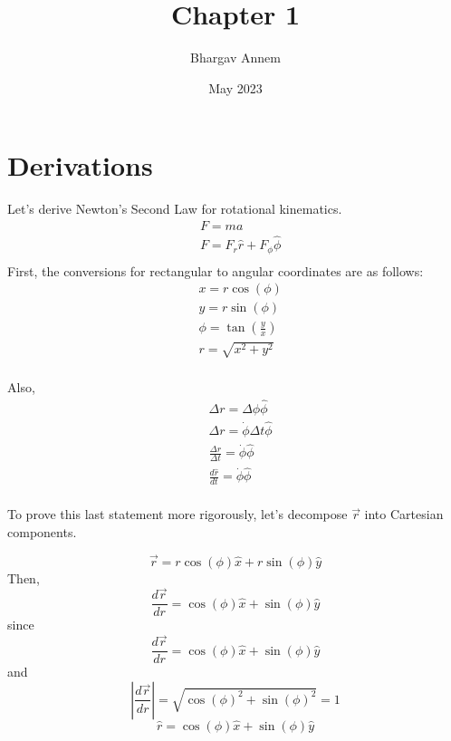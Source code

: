 \documentclass{article}
\title{Chapter 1}
\author{Bhargav Annem}
\date{May 2023}
\begin{document}
\maketitle

\section{Derivations}
Let's derive Newton's Second Law for rotational kinematics.
\begin{equation}
    \begin{aligned}
         & F = ma                              \\
         & F = F_r \hat{r} + F_\phi \hat{\phi} \\
    \end{aligned}
\end{equation}
First, the conversions for rectangular to angular coordinates are as follows:
\begin{equation}
    \begin{aligned}
         & x = r\cos(\phi)          \\
         & y = r\sin(\phi)          \\
         & \phi = \tan(\frac{y}{x}) \\
         & r = \sqrt{x^2+y^2}       \\
    \end{aligned}
\end{equation}

Also,
\begin{equation}
    \begin{aligned}
         & \Delta r=\Delta \phi \hat{\phi}                   \\
         & \Delta r = \dot{\phi} \Delta t \hat{\phi}         \\
         & \frac{\Delta r}{\Delta t} = \dot{\phi} \hat{\phi} \\
         & \frac{d\hat{r}}{dt} = \dot{\phi} \hat{\phi}       \\
    \end{aligned}
\end{equation}

To prove this last statement more rigorously, let's decompose $\vec{r}$ into Cartesian components.

\[\vec{r} = r\cos(\phi)\hat{x} + r\sin(\phi)\hat{y}\]
Then,
\[\frac{d\vec{r}}{dr} = \cos(\phi)\hat{x} + \sin(\phi)\hat{y}\]
since
\[\frac{d\vec{r}}{dr} = \cos(\phi)\hat{x} + \sin(\phi)\hat{y}\]
and
\[|\frac{d\vec{r}}{dr}| = \sqrt{ \cos(\phi)^2 + \sin(\phi)^2 } = 1 \]
\[ \hat{r} = \cos(\phi)\hat{x} + \sin(\phi)\hat{y}\]
\end{document}
